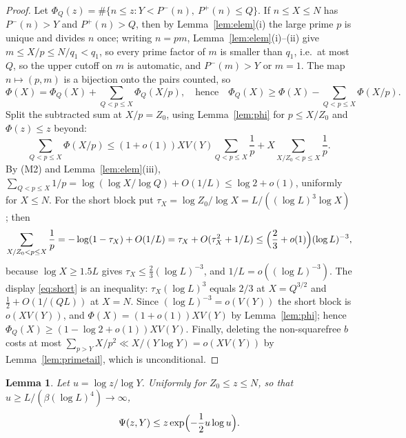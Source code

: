 \documentclass[11pt,a4paper]{article}
\theoremstyle{plain}
\newtheorem{lemma}[theorem]{Lemma}
\theoremstyle{definition}
\theoremstyle{remark}
\newcommand{\Pp}{P^{+}}
\newcommand{\Pm}{P^{-}}
\begin{document}
\begin{proof}
Let $\Phi_{Q}(z)=\#\{n\le z:Y<\Pm(n),\ \Pp(n)\le Q\}$. If $n\le X\le N$ has $\Pm(n)>Y$ and $\Pp(n)>Q$,
then by Lemma~\ref{lem:elem}(i) the large prime $p$ is unique and divides $n$ once; writing $n=pm$,
Lemma~\ref{lem:elem}(i)--(ii) give $m\le X/p\le N/q_{1}<q_{1}$, so every prime factor of $m$ is smaller
than $q_{1}$, i.e.\ at most $Q$, so the upper cutoff on $m$ is automatic, and $\Pm(m)>Y$ or $m=1$. The
map $n\mapsto(p,m)$ is a bijection onto the pairs counted, so
\begin{equation}\label{eq:peel}
  \Phi(X)=\Phi_{Q}(X)+\sum_{Q<p\le X}\Phi_{Q}(X/p),\quad\text{hence}\quad
  \Phi_{Q}(X)\ge\Phi(X)-\sum_{Q<p\le X}\Phi(X/p).
\end{equation}
Split the subtracted sum at $X/p=Z_{0}$, using Lemma~\ref{lem:phi} for $p\le X/Z_{0}$ and $\Phi(z)\le z$
beyond:
\[
  \sum_{Q<p\le X}\Phi(X/p)\le(1+o(1))XV(Y)\!\!\sum_{Q<p\le X}\!\!\frac1p
   +X\!\!\sum_{X/Z_{0}<p\le X}\!\!\frac1p.
\]
By (M2) and Lemma~\ref{lem:elem}(iii), $\sum_{Q<p\le X}1/p=\log(\log X/\log Q)+O(1/L)\le\log2+o(1)$,
uniformly for $X\le N$. For the short block put $\tau_{X}=\log Z_{0}/\log X=L/((\log L)^{3}\log X)$; then
\begin{equation}\label{eq:short}
  \sum_{X/Z_{0}<p\le X}\frac1p=-\log(1-\tau_{X})+O(1/L)=\tau_{X}+O(\tau_{X}^{2}+1/L)
  \le\Bigl(\frac23+o(1)\Bigr)(\log L)^{-3},
\end{equation}
because $\log X\ge1.5L$ gives $\tau_{X}\le\frac23(\log L)^{-3}$, and $1/L=o((\log L)^{-3})$. The display
\eqref{eq:short} is an inequality: $\tau_{X}(\log L)^{3}$ equals $2/3$ at $X=Q^{3/2}$ and
$\frac12+O(1/(QL))$ at $X=N$. Since $(\log L)^{-3}=o(V(Y))$ the short block is $o(XV(Y))$, and
$\Phi(X)=(1+o(1))XV(Y)$ by Lemma~\ref{lem:phi}; hence $\Phi_{Q}(X)\ge(1-\log2+o(1))XV(Y)$. Finally,
deleting the non-squarefree $b$ costs at most $\sum_{p>Y}X/p^{2}\ll X/(Y\log Y)=o(XV(Y))$ by
Lemma~\ref{lem:primetail}, which is unconditional.
\end{proof}

\begin{lemma}\label{lem:psi}
Let $u=\log z/\log Y$. Uniformly for $Z_{0}\le z\le N$, so that
$u\ge L/(\beta(\log L)^{4})\to\infty$,
\[
  \Psi(z,Y)\le z\exp\Bigl(-\frac12u\log u\Bigr).
\]
\end{lemma}
\end{document}
